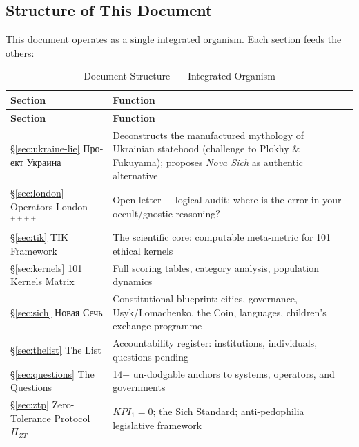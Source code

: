 \documentclass[11pt,a4paper]{article}
\theoremstyle{definition}
\theoremstyle{remark}
\newcommand{\ZTP}{\Pi_{ZT}}                  %
\begin{document}
\subsection{Structure of This Document}
\label{sec:structure}

This document operates as a single integrated organism.
Each section feeds the others:

\begin{longtable}{@{}p{}p{}@{}}
\caption{Document Structure~--- Integrated Organism}
\label{tab:structure}\\
\toprule
\textbf{Section} & \textbf{Function} \\
\midrule
\endfirsthead
\toprule
\textbf{Section} & \textbf{Function} \\
\midrule
\endhead
\bottomrule
\endlastfoot

\S\ref{sec:ukraine-lie}
\foreignlanguage{russian}{Проект Украина}
& Deconstructs the manufactured mythology of Ukrainian statehood
  (challenge to Plokhy \& Fukuyama);
  proposes \textit{Nova Sich} as authentic alternative \\[4pt]

\S\ref{sec:london}
Operators London$^{++++}$
& Open letter + logical audit: where is the error in your
  occult/gnostic reasoning? \\[4pt]

\S\ref{sec:tik}
TIK Framework
& The scientific core: computable meta-metric for 101 ethical kernels \\[4pt]

\S\ref{sec:kernels}
101 Kernels Matrix
& Full scoring tables, category analysis, population dynamics \\[4pt]

\S\ref{sec:sich}
\foreignlanguage{russian}{Новая Сечь}
& Constitutional blueprint: cities, governance, Usyk/Lomachenko,
  the Coin, languages, children's exchange programme \\[4pt]

\S\ref{sec:thelist}
The List
& Accountability register: institutions, individuals, questions pending \\[4pt]

\S\ref{sec:questions}
The Questions
& 14+ un-dodgable anchors to systems, operators, and governments \\[4pt]

\S\ref{sec:ztp}
Zero-Tolerance Protocol $\ZTP$
& $KPI_1 = 0$; the Sich Standard; anti-pedophilia legislative framework \\[4pt]


\end{longtable}
\end{document}
